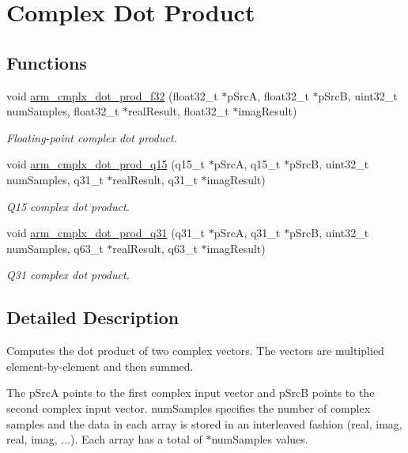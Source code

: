 \hypertarget{group__cmplx__dot__prod}{}\section{Complex Dot Product}
\label{group__cmplx__dot__prod}
\subsection*{Functions}
\begin{DoxyCompactItemize}
\item 
void \hyperlink{group__cmplx__dot__prod_gadcfaf567a25eb641da4043eafb9bb076}{arm\+\_\+cmplx\+\_\+dot\+\_\+prod\+\_\+f32} (float32\+\_\+t $\ast$p\+SrcA, float32\+\_\+t $\ast$p\+SrcB, uint32\+\_\+t num\+Samples, float32\+\_\+t $\ast$real\+Result, float32\+\_\+t $\ast$imag\+Result)
\begin{DoxyCompactList}\small\item\em Floating-\/point complex dot product. \end{DoxyCompactList}\item 
void \hyperlink{group__cmplx__dot__prod_ga2b08b5e8001d2c15204639d00893fc70}{arm\+\_\+cmplx\+\_\+dot\+\_\+prod\+\_\+q15} (q15\+\_\+t $\ast$p\+SrcA, q15\+\_\+t $\ast$p\+SrcB, uint32\+\_\+t num\+Samples, q31\+\_\+t $\ast$real\+Result, q31\+\_\+t $\ast$imag\+Result)
\begin{DoxyCompactList}\small\item\em Q15 complex dot product. \end{DoxyCompactList}\item 
void \hyperlink{group__cmplx__dot__prod_ga5b731a59db062a9ad84562ef68a6c8af}{arm\+\_\+cmplx\+\_\+dot\+\_\+prod\+\_\+q31} (q31\+\_\+t $\ast$p\+SrcA, q31\+\_\+t $\ast$p\+SrcB, uint32\+\_\+t num\+Samples, q63\+\_\+t $\ast$real\+Result, q63\+\_\+t $\ast$imag\+Result)
\begin{DoxyCompactList}\small\item\em Q31 complex dot product. \end{DoxyCompactList}\end{DoxyCompactItemize}


\subsection{Detailed Description}
Computes the dot product of two complex vectors. The vectors are multiplied element-\/by-\/element and then summed.

The {\ttfamily p\+SrcA} points to the first complex input vector and {\ttfamily p\+SrcB} points to the second complex input vector. {\ttfamily num\+Samples} specifies the number of complex samples and the data in each array is stored in an interleaved fashion (real, imag, real, imag, ...). Each array has a total of {$\ast$num\+Samples} values.

